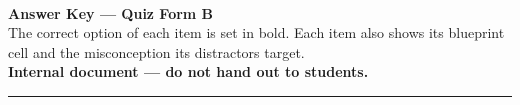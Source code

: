\documentclass[11pt]{exam}
\begin{document}
\begin{center}
  {\Large\bfseries \labtitle}\\[0.4em]
  {\LARGE\bfseries Answer Key --- Quiz Form B}\\[0.6em]
  {\small The correct option of each item is set in bold. Each item also shows its blueprint
  cell and the misconception its distractors target.}\\[0.4em]
  {\small\bfseries Internal document --- do not hand out to students.}
\end{center}

\vspace{0.8em}
\noindent\rule{\linewidth}{1pt}


\end{document}
